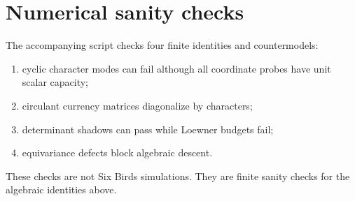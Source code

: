 \documentclass[11pt]{article}
\begin{document}
\section{Numerical sanity checks}
The accompanying script checks four finite identities and countermodels:
\begin{enumerate}
  \item cyclic character modes can fail although all coordinate probes have unit scalar capacity;
  \item circulant currency matrices diagonalize by characters;
  \item determinant shadows can pass while Loewner budgets fail;
  \item equivariance defects block algebraic descent.
\end{enumerate}
These checks are not Six Birds simulations.  They are finite sanity checks for the algebraic identities above.
\end{document}
